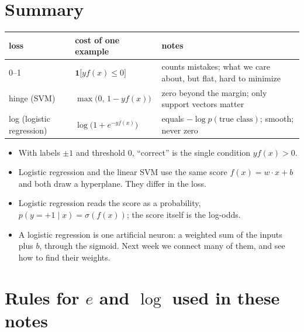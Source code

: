 \documentclass[11pt]{article}
\newcommand{\ind}[1]{\mathbf{1}\bigl[#1\bigr]}
\begin{document}
\section{Summary}

\begin{center}
\renewcommand{\arraystretch}{1.3}
\begin{tabular}{>{\raggedright}p{} >{\centering}p{} >{\raggedright\arraybackslash}p{}}
  \toprule
  loss & cost of one example & notes \\
  \midrule
  0--1 & $\ind{y f(x) \le 0}$ & counts mistakes; what we care about, but flat, hard to minimize \\
  hinge (SVM) & $\max\bigl(0,\, 1 - y f(x)\bigr)$ & zero beyond the margin; only support vectors matter \\
  log (logistic regression) & $\log\bigl(1 + e^{-y f(x)}\bigr)$ & equals $-\log p(\text{true class})$; smooth; never zero \\
  \bottomrule
\end{tabular}
\end{center}

\begin{itemize}
  \item With labels $\pm 1$ and threshold 0, ``correct'' is the single condition $y f(x) > 0$.
  \item Logistic regression and the linear SVM use the same score $f(x) = w \cdot x + b$ and both
        draw a hyperplane. They differ in the loss.
  \item Logistic regression reads the score as a probability, $p(y = +1 \mid x) = \sigma(f(x))$; the
        score itself is the log-odds.
  \item A logistic regression is one artificial neuron: a weighted sum of the inputs plus $b$, through
        the sigmoid. Next week we connect many of them, and see how to find their weights.
\end{itemize}

\clearpage
\appendix
\section{Rules for $e$ and $\log$ used in these notes}\label{app:rules}
\end{document}
